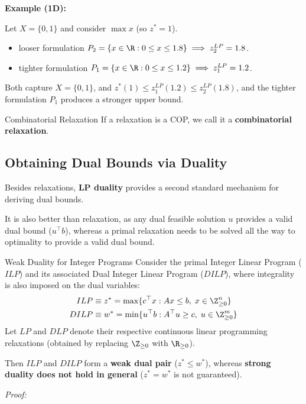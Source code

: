 \documentclass[a4paper, 11pt]{report}
\begin{document}
\textbf{Example (1D):}

Let $X = \{0,1\}$ and consider $\max x$ (so $z^* = 1$).
\begin{itemize}
    \item looser formulation $P_2 = \{ x \in \R : 0 \leq x \leq 1.8 \} \implies z_2^{LP} = 1.8$.
    \item tighter formulation $P_1 = \{ x \in \R : 0 \leq x \leq 1.2 \} \implies z_1^{LP} = 1.2$.
\end{itemize}
Both capture $X = \{0,1\}$, and $z^* (1) \leq z_1^{LP} (1.2) \leq z_2^{LP} (1.8)$, and the tighter formulation $P_1$ produces a stronger upper bound.

\begin{defframe}{Combinatorial Relaxation}{}
    If a relaxation is a COP, we call it a \textbf{combinatorial relaxation}.
\end{defframe}

\subsection{Obtaining Dual Bounds via Duality}
Besides relaxations, \textbf{LP duality} provides a second standard mechanism for deriving dual bounds.

It is also better than relaxation, as any dual feasible solution $u$ provides a valid dual bound ($u^\top b$), whereas a primal relaxation needs to be solved all the way to optimality to provide a valid dual bound.

\begin{thmframe}{Weak Duality for Integer Programs}{}
Consider the primal Integer Linear Program ($ILP$) and its associated Dual Integer Linear Program ($DILP$), where integrality is also imposed on the dual variables:
\begin{align*}
    ILP &\equiv z^* = \max \{ c^\top x : Ax \leq b, \; x \in \Z_{\geq 0}^n \} \\
    DILP &\equiv w^* = \min \{ u^\top b : A^\top u \geq c, \; u \in \Z_{\geq 0}^m \}
\end{align*}
Let $LP$ and $DLP$ denote their respective continuous linear programming relaxations (obtained by replacing $\Z_{\geq 0}$ with $\R_{\geq 0}$). 

Then $ILP$ and $DILP$ form a \textbf{weak dual pair} ($z^* \leq w^*$), whereas \textbf{strong duality does not hold in general} ($z^* = w^*$ is not guaranteed).
\end{thmframe}

\textit{Proof:} 
\end{document}
